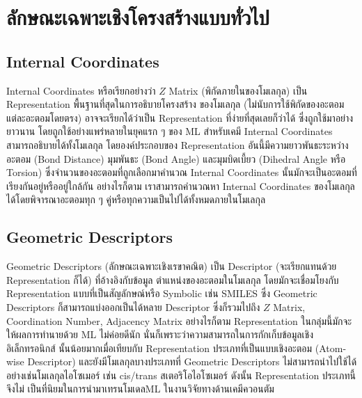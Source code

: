 \section{ลักษณะเฉพาะเชิงโครงสร้างแบบทั่วไป}
\label{sec:struc_feat}

\subsection{Internal Coordinates}
\label{ssec:internal_coord}

Internal Coordinates หรือเรียกอย่างว่า $Z$ Matrix (พิกัดภายในของโมเลกุล) เป็น Representation พื้นฐานที่สุดในการอธิบายโครงสร้าง%
ของโมเลกุล (ไม่นับการใช้พิกัดของอะตอมแต่ละอะตอมโดยตรง) อาจจะเรียกได้ว่าเป็น Representation ที่ง่ายที่สุดเลยก็ว่าได้ ซึ่งถูกใช้มาอย่างยาวนาน 
โดยถูกใช้อย่างแพร่หลายในยุคแรก ๆ ของ ML สำหรับเคมี Internal Coordinates สามารถอธิบายได้ทั้งโมเลกุล โดยองค์ประกอบของ 
Representation อันนี้มีความยาวพันธะระหว่างอะตอม (Bond Distance) มุมพันธะ (Bond Angle) และมุมบิดเบี้ยว (Dihedral Angle หรือ 
Torsion) ซึ่งจำนวนของอะตอมที่ถูกเลือกมาคำนวณ Internal Coordinates นั้นมักจะเป็นอะตอมที่เรียงกันอยู่หรืออยู่ใกล้กัน อย่างไรก็ตาม 
เราสามารถคำนวณหา Internal Coordinates ของโมเลกุลได้โดยพิจารณาอะตอมทุก ๆ คู่หรือทุกความเป็นไปได้ทั้งหมดภายในโมเลกุล

\subsection{Geometric Descriptors}
\label{ssec:geom_descriptor}

Geometric Descriptors (ลักษณะเฉพาะเชิงเรขาคณิต) เป็น Descriptor (จะเรียกแทนด้วย Representation ก็ได้) ที่อ้างอิงกับข้อมูล%
ตำแหน่งของอะตอมในโมเลกุล โดยมักจะเชื่อมโยงกับ Representation แบบที่เป็นสัญลักษณ์หรือ Symbolic เช่น SMILES ซึ่ง Geometric 
Descriptors ก็สามารถแบ่งออกเป็นได้หลาย Descriptor ซึ่งก็รวมไปถึง $Z$ Matrix, Coordination Number, Adjacency Matrix 
อย่างไรก็ตาม Representation ในกลุ่มนี้มักจะให้ผลการทำนายด้วย ML ไม่ค่อยดีนัก นั่นก็เพราะว่าความสามารถในการกักเก็บข้อมูลเชิงอิเล็กทรอนิกส์%
นั้นน้อยมากเมื่อเทียบกับ Representation ประเภทที่เป็นแบบเชิงอะตอม (Atom-wise Descriptor) และยังมีโมเลกุลบางประเภทที่ Geometric 
Descriptors ไม่สามารถนำไปใช้ได้ อย่างเช่นโมเลกุลไอโซเมอร์ เช่น cis/trans สเตอริโอไอโซเมอร์ ดังนั้น Representation ประเภทนี้จึงไม่%
เป็นที่นิยมในการนำมาเทรนโมเดลML ในงานวิจัยทางด้านเคมีควอนตัม\autocite{keith2021,musil2021}


